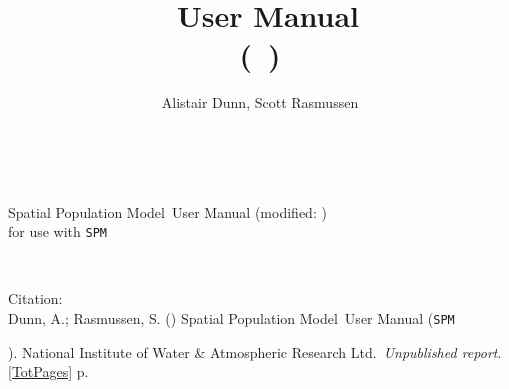 \documentclass[a4paper,11pt,twoside,pdftex]{article}
\title{\SPMName\ User Manual \\(\SPM\ \VER)} %
\author{Alistair Dunn, Scott Rasmussen}  %
\date{\DocDate} %
\renewcommand{\headrulewidth}{0pt} %
\newcommand{\DocYear}{\SourceControlYearDoc}
\newcommand{\DocVer}{\SourceControlDateDoc}
\newcommand{\VER}{\begin{small}\end{small}} %
\newcommand{\SPM}{\texttt{SPM}} %
\newcommand{\SPMName}{Spatial Population Model} %
\newcommand{\Organisation}{National Institute of Water \& Atmospheric Research Ltd.} %
\newcommand{\ManualRef}{Dunn, A.; Rasmussen, S. (\DocYear) \SPMName\ User Manual (\SPM\ \VER). \Organisation\ \emph{Unpublished report}. \ref{TotPages} p.} %
\let\origdoublepage\cleardoublepage
\newcommand{\clearemptydoublepage}{%
  \clearpage
  {\pagestyle{empty}\origdoublepage}%
}
\begin{document}
\sloppy %

\maketitle
\thispagestyle{empty} %
~\vfill
\begin{center}
\SPMName\ User Manual (modified: \DocVer) \\ for use with \SPM\ \VER
\end{center}

\cleardoublepage{}
\fancyfoot[C]{\thepage}
~\vfill
\begin{center}
{Citation:\\ \ManualRef}
\end{center}

\clearemptydoublepage{}
\begin{spacing}{0.8} %
\tableofcontents
\end{spacing}

\clearemptydoublepage{}
\begin{spacing}{0.8} %
\renewcommand\listfigurename{List of figures}
\listoffigures
\end{spacing}

\clearemptydoublepage{}
\begin{spacing}{0.8} %
\renewcommand\listtablename{List of tables}
\listoftables
\end{spacing}

\clearemptydoublepage{}
\renewcommand{\headrulewidth}{0.2pt}
\fancyhead[LE]{\slshape \nouppercase \rightmark} %
\fancyhead[RO]{\slshape \nouppercase \leftmark}  %


\clearemptydoublepage{}


\clearemptydoublepage{}

\end{document}
